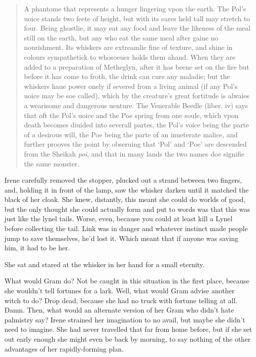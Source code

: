\documentclass[../FGP.tex]{subfiles}
\begin{document}
\begin{quote}A phantome that represents a hunger lingering vpon the earth. The Pol's uoice stands two feete of height, but with its eares held tall may stretch to four. Being ghostlie, it may eat any food and leave the likeness of the meal still on the earth, but any who eat the same meal after gaine no nourishment. Its whiskers are extreamlie fine of texture, and shine in colours sympathetick to whosoeuer holds them ahand. When they are added to a preparation of Metheglyn, after it has beene set on the fire but before it has come to froth, the drink can cure any maladie; but the whiskers haue power onely if severed from a living animal (if any Pol's uoice may be soe called), which by the creature's great fortitude is alwaies a wearisome and dangerous uenture. The Venerable Beedle (liber. iv) says that oft the Pol's uoice and the Poe spring from one soule, which vpon death becomes diuided into severall partes, the Pol's voice being the parte of a desirous will, the Poe being the parte of an inueterate malice, and further prooves the point by obseruing that `Pol' and `Poe' are descended from the Sheikah \emph{poi}, and that in many lands the two names doe signifie the same monster.\end{quote}
Irene carefully removed the stopper, plucked out a strand between two fingers, and, holding it in front of the lamp, saw the whisker darken until it matched the black of her cloak. She knew, distantly, this meant she could do worlds of good, but the only thought she could actually form and put to words was that this was just like the lynel tails. Worse, even, because you could at least kill a Lynel before collecting the tail. Link was in danger and whatever instinct made people jump to save themselves, he'd lost it. Which meant that if anyone was saving him, it had to be her.

She sat and stared at the whisker in her hand for a small eternity.

What would Gram do? Not be caught in this situation in the first place, because she wouldn't tell fortunes for a lark. Well, what would Gram advise another witch to do? Drop dead, because she had no truck with fortune telling at all. Damn. Then, what would an alternate version of her Gram who didn't hate palmistry say? Irene strained her imagination to no avail, but maybe she didn't need to imagine. She had never travelled that far from home before, but if she set out early enough she might even be back by morning, to say nothing of the other advantages of her rapidly-forming plan. 
\end{document}
